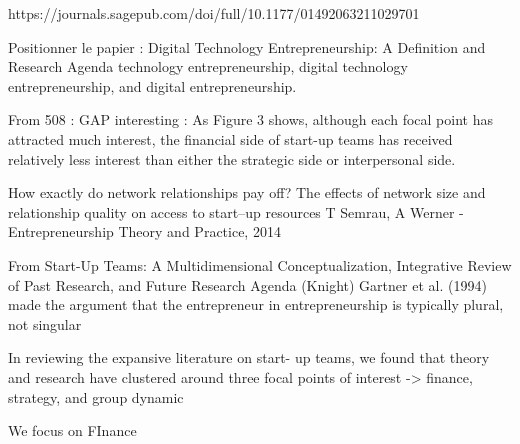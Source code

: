 \documentclass[12pt]{article}
\begin{document}




https://journals.sagepub.com/doi/full/10.1177/01492063211029701








Positionner le papier :
Digital Technology Entrepreneurship: A Definition and Research Agenda
technology entrepreneurship, digital technology entrepreneurship, and digital entrepreneurship.

From 508 : GAP interesting : As Figure 3 shows, although each focal point has attracted much interest, the financial side of start-up teams has received relatively less interest than either the strategic side or interpersonal side.

How exactly do network relationships pay off? The effects of network size and relationship quality on access to start–up resources
T Semrau, A Werner - Entrepreneurship Theory and Practice, 2014

From Start-Up Teams: A Multidimensional Conceptualization, Integrative Review of Past Research, and Future Research Agenda (Knight)
Gartner et al. (1994) made the argument that the entrepreneur in entrepreneurship is typically plural, not singular

In reviewing the expansive literature on start- up teams, we found that theory and research have clustered around three focal points of interest -> finance, strategy, and group dynamic

We focus on FInance
\end{document}
